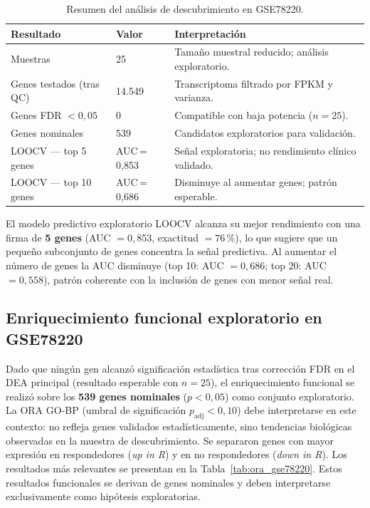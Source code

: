 \begin{table}[H]
\centering
\caption{Resumen del análisis de descubrimiento en GSE78220.}
\label{tab:discovery_gse78220}
\begin{tabularx}{\textwidth}{l l X}
\toprule
Resultado & Valor & Interpretación \\
\midrule
Muestras & 25 & Tamaño muestral reducido; análisis exploratorio. \\
Genes testados (tras QC) & 14.549 & Transcriptoma filtrado por FPKM y varianza. \\
Genes FDR $< 0{,}05$ & 0 & Compatible con baja potencia ($n=25$). \\
Genes nominales & 539 & Candidatos exploratorios para validación. \\
LOOCV — top 5 genes & AUC\,=\,0{,}853 & Señal exploratoria; no rendimiento clínico validado. \\
LOOCV — top 10 genes & AUC\,=\,0{,}686 & Disminuye al aumentar genes; patrón esperable. \\
\bottomrule
\end{tabularx}
\end{table}

El modelo predictivo exploratorio LOOCV alcanza su mejor rendimiento con una firma de \textbf{5 genes} (AUC $= 0{,}853$, exactitud $= 76\,\text{\%}$), lo que sugiere que un pequeño subconjunto de genes concentra la señal predictiva. Al aumentar el número de genes la AUC disminuye (top 10: AUC $= 0{,}686$; top 20: AUC $= 0{,}558$), patrón coherente con la inclusión de genes con menor señal real.

\subsection{Enriquecimiento funcional exploratorio en GSE78220}

Dado que ningún gen alcanzó significación estadística tras corrección FDR en el DEA principal (resultado esperable con $n=25$), el enriquecimiento funcional se realizó sobre los \textbf{539 genes nominales} ($p < 0{,}05$) como conjunto exploratorio. La ORA GO-BP (umbral de significación $p_{\text{adj}} < 0{,}10$) debe interpretarse en este contexto: no refleja genes validados estadísticamente, sino tendencias biológicas observadas en la muestra de descubrimiento. Se separaron genes con mayor expresión en respondedores (\textit{up in R}) y en no respondedores (\textit{down in R}). Los resultados más relevantes se presentan en la Tabla~\ref{tab:ora_gse78220}. Estos resultados funcionales se derivan de genes nominales y deben interpretarse exclusivamente como hipótesis exploratorias.

